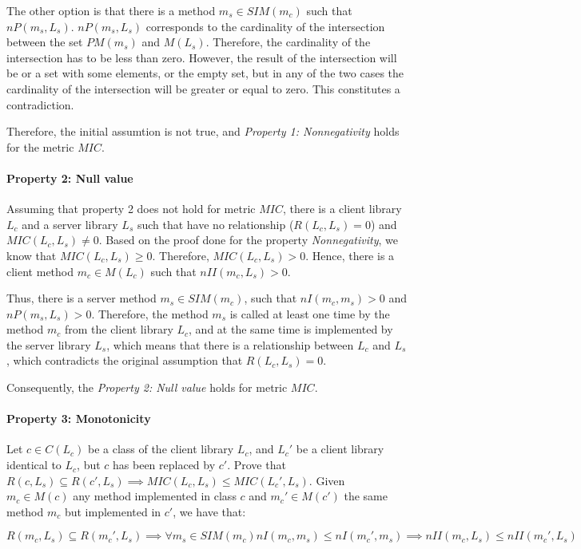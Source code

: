 The other option is that there is a method $m_s \in SIM(m_c)$ such that $nP(m_s, L_s)$. $nP(m_s, L_s)$ corresponds to the cardinality of the intersection between the set $PM(m_s)$ and $M(L_s)$. Therefore, the cardinality of the intersection has to be less than zero. However, the result of the intersection will be or a set with some elements, or the empty set, but in any of the two cases the cardinality of the intersection will be greater or equal to zero. This constitutes a contradiction.

Therefore, the initial assumtion is not true, and \textit{Property 1: Nonnegativity} holds for the metric $MIC$.

\paragraph{Property 2: Null value}
Assuming that property 2 does not hold for metric $MIC$, there is a client library $L_c$ and a server library $L_s$ such that have no relationship ($R(L_c, L_s) = 0$) and $MIC(L_c, L_s) 	\neq 0$. Based on the proof done for the property \textit{Nonnegativity}, we know that $MIC(L_c, L_s) \ge 0$. Therefore, $MIC(L_c, L_s) > 0$. Hence, there is a client method $m_c \in M(L_c)$ such that $nII(m_c, L_s) > 0$.

Thus, there is a server method $m_s \in SIM(m_c)$, such that $nI(m_c, m_s) > 0$ and $nP(m_s, L_s) > 0$. Therefore, the method $m_s$ is called at least one time by the method $m_c$ from the client library $L_c$, and at the same time is implemented by the server library $L_s$, which means that there is a relationship between $L_c$ and $L_s$, which contradicts the original assumption that $R(L_c, L_s) = 0$.

Consequently, the \textit{Property 2: Null value} holds for metric $MIC$.

\paragraph{Property 3: Monotonicity}
Let $c \in C(L_c)$ be a class of the client library $L_c$, and $L_c'$ be a client library identical to $L_c$, but $c$ has been replaced by $c'$. Prove that $R(c, L_s) \subseteq R(c', L_s) \implies MIC(L_c, L_s) \le MIC(L_c', L_s)$. Given $m_c \in M(c)$ any method implemented in class $c$ and $m_c' \in M(c')$ the same method $m_c$ but implemented in $c'$, we have that:

\begin{equation*}
   R(m_c, L_s) \subseteq R(m_c', L_s) \implies \forall m_s \in SIM(m_c)  nI(m_c, m_s) \le nI(m_c', m_s) \implies nII(m_c, L_s) \le nII(m_c', L_s)
\end{equation*}

